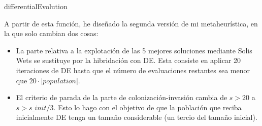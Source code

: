 \documentclass[10pt,a4paper]{article}
\begin{document}
\begin{algorithm}[H]
	\caption{differentialEvolution}
\end{algorithm}

A partir de esta función, he diseñado la segunda versión de mi metaheurística, en la que solo cambian dos cosas:

\begin{itemize}
	\item La parte relativa a la explotación de las 5 mejores soluciones mediante Solis Wets se sustituye por la hibridación con DE. Esta consiste en aplicar 20 iteraciones de DE hasta que el número de evaluaciones restantes sea menor que $20 \cdot |population|$.
	\item El criterio de parada de la parte de colonización-invasión cambia de $s>20$ a $s > s\_init/3$. Esto lo hago con el objetivo de que la población que reciba inicialmente DE tenga un tamaño considerable (un tercio del tamaño inicial).
\end{itemize}
\end{document}
